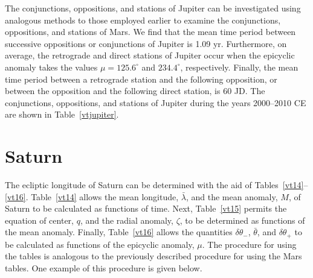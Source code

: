 The conjunctions, oppositions, and stations of Jupiter can be investigated
using analogous methods to those employed earlier to examine the
conjunctions, oppositions, and stations of Mars. We find that the mean
time period between successive oppositions or conjunctions of
Jupiter is 1.09 yr. Furthermore, on average, the retrograde and direct
stations of Jupiter occur when the epicyclic anomaly takes the
values $\mu=125.6^\circ$ and $234.4^\circ$, respectively. Finally,
the mean time period between a retrograde station and the following
opposition, or between the opposition and the following direct
station, is 60 JD. The conjunctions, oppositions, and stations of Jupiter
during the years 2000--2010 CE are shown in Table~\ref{vtjupiter}.

\section{Saturn}
The ecliptic longitude of Saturn can be determined with the aid of Tables~\ref{vt14}--\ref{vt16}. Table~\ref{vt14} allows
the mean longitude, $\bar{\lambda}$, and the mean anomaly, $M$, of Saturn to be calculated as functions of
time. Next, Table~\ref{vt15} permits the equation of center, $q$, and the radial anomaly, $\zeta$, to
be determined as functions of the mean anomaly. Finally, Table~\ref{vt16} allows the quantities
$\delta\theta_-$, $\bar{\theta}$, and $\delta\theta_+$ to be calculated as functions of the epicyclic
anomaly, $\mu$. 
The procedure for using the tables is analogous to the previously described procedure for
using the Mars tables.
One example of this procedure is given below.

